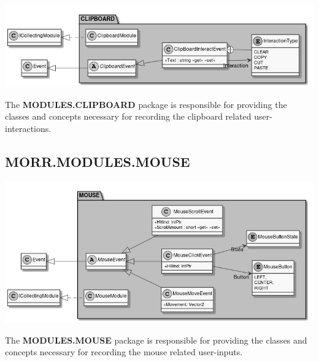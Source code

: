 \begin{center}
    \includegraphics[width=1.0\textwidth]{resources/Packages/MODULES_CLIPBOARD.png}
\end{center}

The \textbf{MODULES.CLIPBOARD} package is responsible for providing the classes and concepts necessary for recording the clipboard related user-interactions.

\begin{packclass}
\end{packclass}

\begin{packenum}
\end{packenum}

\newpage
\subsection*{MORR.MODULES.MOUSE}

\begin{center}
    \includegraphics[width=1.0\textwidth]{resources/Packages/MODULES_MOUSE.png}
\end{center}

The \textbf{MODULES.MOUSE} package is responsible for providing the classes and concepts necessary for recording the mouse related user-inputs.

\begin{packclass}
\end{packclass}

